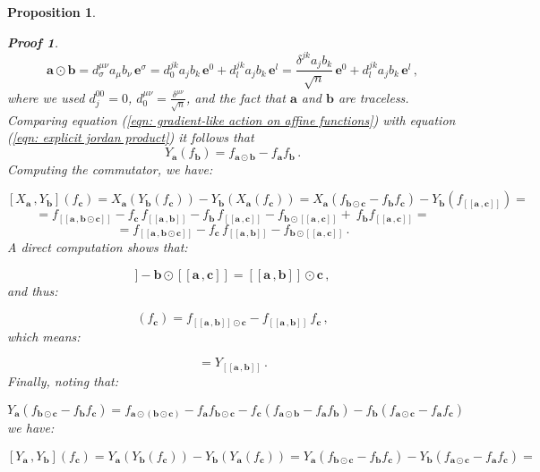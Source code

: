 \documentclass[11pt]{article}
\newcommand{\be}{\begin{equation}}
\newcommand{\ee}{\end{equation}}
\newtheorem{prop}{Proposition}
\newtheorem*{pf}{Proof}
\begin{document}
\begin{prop}
\begin{pf}
\be\label{eqn: explicit jordan product}
\mathbf{a}\odot\mathbf{b}=d^{\mu\nu}_{\sigma}a_{\mu}b_{\nu}\,\mathbf{e}^{\sigma}=d^{jk}_{0}a_{j}b_{k}\,\mathbf{e}^{0} + d^{jk}_{l}a_{j}b_{k}\,\mathbf{e}^{l}=\frac{\delta^{jk}a_{j}b_{k}}{\sqrt{n}}\,\mathbf{e}^{0} + d^{jk}_{l}a_{j}b_{k}\,\mathbf{e}^{l}\,,
\ee
where we used $d^{0 0}_{j}=0$, $d^{\mu\nu}_{0}=\frac{\delta^{\mu\nu}}{\sqrt{n}}$, and the fact that $\mathbf{a}$ and $\mathbf{b}$ are traceless.
Comparing equation (\ref{eqn: gradient-like action on affine functions}) with equation (\ref{eqn: explicit jordan product}) it follows that 
\be
Y_{\mathbf{a}}(f_{\mathbf{b}})=f_{\mathbf{a}\odot\mathbf{b}}  - f_{\mathbf{a}}f_{\mathbf{b}} \,.
\ee
Computing the commutator, we have:

$$
[X_{\mathbf{a}}\,,Y_{\mathbf{b}}](f_{\mathbf{c}})=X_{\mathbf{a}}(Y_{\mathbf{b}}(f_{\mathbf{c}})) - Y_{\mathbf{b}}(X_{\mathbf{a}}(f_{\mathbf{c}}))=X_{\mathbf{a}}\left(f_{\mathbf{b}\odot\mathbf{c}}-  f_{\mathbf{b}}f_{\mathbf{c}} \right) - Y_{\mathbf{b}}(f_{[[\mathbf{a}\,,\mathbf{c}]]})=
$$
$$
=f_{[[\mathbf{a}\,,\mathbf{b}\odot\mathbf{c}]]} - f_{\mathbf{c}}\,f_{[[\mathbf{a}\,,\mathbf{b}]]}  -  f_{\mathbf{b}}\,f_{[[\mathbf{a}\,,\mathbf{c}]]}  - f_{\mathbf{b}\odot[[\mathbf{a}\,,\mathbf{c}]]} + \ f_{\mathbf{b}}f_{[[\mathbf{a}\,,\mathbf{c}]]} =
$$
$$
=f_{[[\mathbf{a}\,,\mathbf{b}\odot\mathbf{c}]]} - f_{\mathbf{c}}\,f_{[[\mathbf{a}\,,\mathbf{b}]]} - f_{\mathbf{b}\odot[[\mathbf{a}\,,\mathbf{c}]]} \,.
$$
A direct computation shows that:


\be
[[\mathbf{a}\,,\mathbf{b}\odot\mathbf{c}]] - \mathbf{b}\odot[[\mathbf{a}\,,\mathbf{c}]]=[[\mathbf{a}\,,\mathbf{b}]]\odot\mathbf{c}\,,
\ee
and thus:

\be
[X_{\mathbf{a}}\,,Y_{\mathbf{b}}](f_{\mathbf{c}})=f_{[[\mathbf{a}\,,\mathbf{b}]]\odot\mathbf{c}}  - f_{[[\mathbf{a}\,,\mathbf{b}]]}\,f_{\mathbf{c}} \,,
\ee
which means:

\be
[X_{\mathbf{a}}\,,Y_{\mathbf{b}}]=Y_{[[\mathbf{a}\,,\mathbf{b}]]}\,.
\ee
Finally, noting that:

$$
Y_{\mathbf{a}}\left(f_{\mathbf{b}\odot\mathbf{c}}  -  f_{\mathbf{b}}f_{\mathbf{c}} \right)=f_{\mathbf{a}\odot(\mathbf{b}\odot\mathbf{c})}  -  f_{\mathbf{a}}f_{\mathbf{b}\odot\mathbf{c}}  - f_{\mathbf{c}}\left(f_{\mathbf{a}\odot\mathbf{b}}  - f_{\mathbf{a}}f_{\mathbf{b}} \right) - f_{\mathbf{b}}\left(f_{\mathbf{a}\odot\mathbf{c}} -  f_{\mathbf{a}}f_{\mathbf{c}} \right)
$$
we have:

$$
[Y_{\mathbf{a}}\,,Y_{\mathbf{b}}](f_{\mathbf{c}})=Y_{\mathbf{a}}(Y_{\mathbf{b}}(f_{\mathbf{c}})) - Y_{\mathbf{b}}(Y_{\mathbf{a}}(f_{\mathbf{c}}))=Y_{\mathbf{a}}\left(f_{\mathbf{b}\odot\mathbf{c}}  -  f_{\mathbf{b}}f_{\mathbf{c}} \right) - Y_{\mathbf{b}}\left(f_{\mathbf{a}\odot\mathbf{c}} -  f_{\mathbf{a}}f_{\mathbf{c}} \right)=
$$


\end{pf}
\end{prop}
\end{document}
